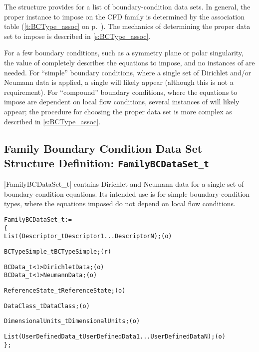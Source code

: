 The  structure provides for a list of
boundary-condition data sets.
In general, the proper  instance to impose on
the CFD family is determined by the  association table
(\autoref{t:BCType_assoc} on p.~\pageref*{t:BCType_assoc}).
The mechanics of determining the proper data set to impose is described
in \autoref{s:BCType_assoc}.

For a few boundary conditions, such as a symmetry plane or polar
singularity, the value of  completely describes the
equations to impose, and no instances of  are needed.
For ``simple'' boundary conditions, where a single set of Dirichlet
and/or Neumann data is applied, a single  will likely
appear (although this is not a requirement).
For ``compound'' boundary conditions, where the equations to impose
are dependent on local flow conditions, several instances of
 will likely appear; the procedure for choosing the
proper data set is more complex as described in \autoref{s:BCType_assoc}.

\subsection{Family Boundary Condition Data Set Structure Definition: \texttt{FamilyBCDataSet\_t}}
\label{s:FamilyBCDataSet}

|FamilyBCDataSet_t| contains Dirichlet and Neumann data for a single set of
boundary-condition equations. Its intended use is for simple boundary-condition
types, where the equations imposed do not depend on local flow conditions.

\begin{alltt}
  FamilyBCDataSet\_t :=
    \{
    List( Descriptor\_t Descriptor1 ... DescriptorN ) ;                      (o)

    BCTypeSimple\_t BCTypeSimple ;                                           (r)

    BCData\_t<1> DirichletData ;                                             (o)
    BCData\_t<1> NeumannData ;                                               (o)

    ReferenceState\_t ReferenceState ;                                       (o)

    DataClass\_t DataClass ;                                                 (o)

    DimensionalUnits\_t DimensionalUnits ;                                   (o)

    List( UserDefinedData\_t UserDefinedData1 ... UserDefinedDataN ) ;       (o)
    \} ;
\end{alltt}

